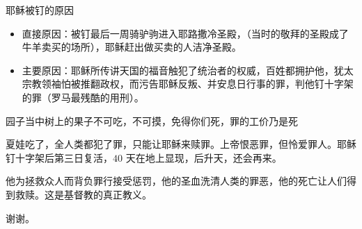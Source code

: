 \documentclass[UTF8]{ctexbeamer}
\begin{document}
	\begin{frame}{耶稣被钉的原因}
		\pause
		\begin{itemize}
			\item 直接原因：被钉最后一周骑驴驹进入耶路撒冷圣殿，（当时的敬拜的圣殿成了牛羊卖买的场所），耶稣赶出做买卖的人洁净圣殿。\par\pause
			\item 主要原因：耶稣所传讲天国的福音触犯了统治者的权威，百姓都拥护他，犹太宗教领袖怕被推翻政权，而污告耶稣反叛、并安息日行事的罪，判他钉十字架的罪（罗马最残酷的用刑）。\par\pause
		\end{itemize}
		\pause
		园子当中树上的果子不可吃，不可摸，免得你们死，罪的工价乃是死\par\pause
		夏娃吃了，全人类都犯了罪，只能让耶稣来赎罪。上帝恨恶罪，但怜爱罪人。\pause 耶稣钉十字架后第三日复活，$40$ 天在地上显现，后升天，还会再来。\par\pause
		他为拯救众人而背负罪行接受惩罚，他的圣血洗清人类的罪恶，他的死亡让人们得到救赎。这是基督教的真正教义。
	\end{frame}
	\begin{frame}{}
		谢谢。
	\end{frame}
	
	
	
\end{document}

